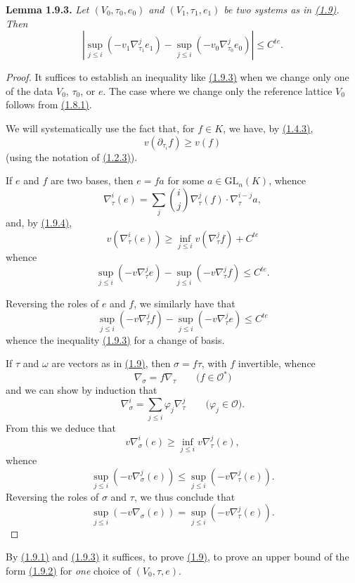 \documentclass{report}
\newenvironment{itenv}[1]
  {\phantomsection\par\medskip\noindent\textbf{#1.}\itshape}
  {\medskip}
\renewcommand{\cal}[1]{{\mathcal{#1}}}
\newcommand{\GL}{\mathrm{GL}}
\renewcommand{\geq}{\geqslant}
\renewcommand{\leq}{\leqslant}
\newcommand{\oldpage}[1]{\marginpar{\footnotesize$\Big\vert$ \textit{p.~#1}}}
\begin{document}
\begin{itenv}{Lemma 1.9.3}
\label{II.1.9.3}
  Let $(V_0,\tau_0,e_0)$ and $(V_1,\tau_1,e_1)$ be two systems as in \hyperref[II.1.9]{(1.9)}.
  Then
  \[
    |\sup_{j\leq i}(-v_1\nabla_{\tau_1}^j e_1) - \sup_{j\leq i}(-v_0\nabla_{\tau_0}^j e_0)| \leq C^{te}.
  \]
\end{itenv}

\begin{proof}
  It suffices to establish an inequality like \hyperref[II.1.9.3]{(1.9.3)} when we change only one of the data $V_0$, $\tau_0$, or $e$.
  The case where we change only the reference lattice $V_0$ follows from \hyperref[II.1.8.1]{(1.8.1)}.

  We will systematically use the fact that, for $f\in K$, we have, by \hyperref[II.1.4.3]{(1.4.3)},
  \[
  \label{II.1.9.4}
    v(\partial_{\tau_i}f) \geq v(f)
  \tag{1.9.4}
  \]
  (using the notation of \hyperref[II.1.2.3]{(1.2.3)}).

  If $e$ and $f$ are two bases, then $e=fa$ for some $a\in\GL_n(K)$, whence
  \[
    \nabla_\tau^i(e) = \sum_j\binom{i}{j}\nabla_\tau^j(f)\cdot\nabla_\tau^{i-j}a,
  \]
  and, by \hyperref[II.1.9.4]{(1.9.4)},
  \[
    v(\nabla_\tau^i(e)) \geq \inf_{j\leq i}v(\nabla_\tau^j f) + C^{te}
  \]
  whence
  \[
    \sup_{j\leq i}(-v\nabla_\tau^j e) - \sup_{j\leq i}(-v\nabla_\tau^j f) \leq C^{te}.
  \]

  Reversing the roles of $e$ and $f$, we similarly have that
  \[
    \sup_{j\leq i}(-v\nabla_\tau^j f) - \sup_{j\leq i}(-v\nabla_\tau^j e) \leq C^{te}
  \]
  whence the inequality \hyperref[II.1.9.3]{(1.9.3)} for a change of basis.

\oldpage{47}
  If $\tau$ and $\omega$ are vectors as in \hyperref[II.1.9]{(1.9)}, then $\sigma=f\tau$, with $f$ invertible, whence
  \[
    \nabla_\sigma = f\nabla_\tau
    \qquad\mbox{($f\in\cal{O}^*$)}
  \]
  and we can show by induction that
  \[
    \nabla_\sigma^i = \sum_{j\leq i}\varphi_j\nabla_\tau^j
    \qquad\mbox{($\varphi_j\in\cal{O}$)}.
  \]
  From this we deduce that
  \[
    v\nabla_\sigma^i(e) \geq \inf_{j\leq i}v\nabla_\tau^j(e),
  \]
  whence
  \[
    \sup_{j\leq i}(-v\nabla_\sigma^j(e)) \leq \sup_{j\leq i}(-v\nabla_\tau^j(e)).
  \]
  Reversing the roles of $\sigma$ and $\tau$, we thus conclude that
  \[
  \label{II.1.9.5}
    \sup_{j\leq i}(-v\nabla_\sigma(e)) = \sup_{j\leq i}(-v\nabla_\tau^j(e)).
  \tag{1.9.5}
  \]
\end{proof}

By \hyperref[II.1.9.1]{(1.9.1)} and \hyperref[II.1.9.3]{(1.9.3)} it suffices, to prove \hyperref[II.1.9]{(1.9)}, to prove an upper bound of the form \hyperref[II.1.9.2]{(1.9.2)} for \emph{one} choice of $(V_0,\tau,e)$.
\end{document}
